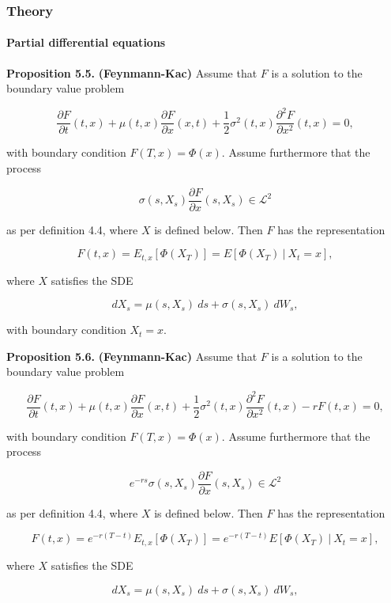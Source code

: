 \documentclass[
]{article}
\begin{document}
\hypertarget{theory-2}{%
\subsubsection{Theory}\label{theory-2}}

\hypertarget{partial-differential-equations}{%
\paragraph{Partial differential
equations}\label{partial-differential-equations}}

\textbf{Proposition 5.5.} \textbf{(Feynmann-Kac)} Assume that \(F\) is a
solution to the boundary value problem

\[
\frac{\partial F}{\partial t}(t,x)+\mu(t,x)\frac{\partial F}{\partial x}(x,t)+\frac{1}{2}\sigma^2(t,x)\frac{\partial^2 F}{\partial x^2}(t,x)=0,
\]

with boundary condition \(F(T,x)=\Phi(x)\). Assume furthermore that the
process

\[
\sigma(s,X_s)\frac{\partial F}{\partial x}(s,X_s) \in \mathcal{L}^2
\]

as per definition 4.4, where \(X\) is defined below. Then \(F\) has the
representation

\[
F(t,x)=E_{t,x}[\Phi(X_T)]=E[\Phi(X_T)\ \vert\ X_t=x],
\]

where \(X\) satisfies the SDE

\[
dX_s=\mu(s,X_s)\ ds+\sigma(s,X_s)\ dW_s,
\]

with boundary condition \(X_t=x\).

\textbf{Proposition 5.6.} \textbf{(Feynmann-Kac)} Assume that \(F\) is a
solution to the boundary value problem

\[
\frac{\partial F}{\partial t}(t,x)+\mu(t,x)\frac{\partial F}{\partial x}(x,t)+\frac{1}{2}\sigma^2(t,x)\frac{\partial^2 F}{\partial x^2}(t,x)-rF(t,x)=0,
\]

with boundary condition \(F(T,x)=\Phi(x)\). Assume furthermore that the
process

\[
e^{-rs}\sigma(s,X_s)\frac{\partial F}{\partial x}(s,X_s) \in \mathcal{L}^2
\]

as per definition 4.4, where \(X\) is defined below. Then \(F\) has the
representation

\[
F(t,x)=e^{-r(T-t)}E_{t,x}[\Phi(X_T)]=e^{-r(T-t)}E[\Phi(X_T)\ \vert\ X_t=x],
\]

where \(X\) satisfies the SDE

\[
dX_s=\mu(s,X_s)\ ds+\sigma(s,X_s)\ dW_s,
\]
\end{document}

